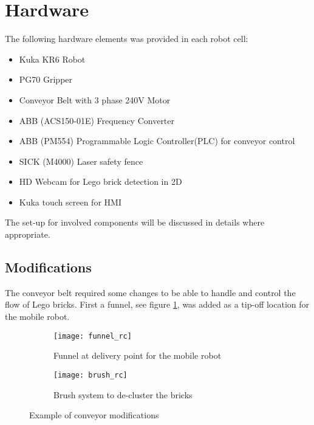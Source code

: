 \section{Hardware}
\label{sec:rc_hardware}
The following hardware elements was provided in each robot cell:

\begin{itemize}
	\item Kuka KR6 Robot
	\item PG70 Gripper
	\item Conveyor Belt with 3 phase 240V Motor
	\item ABB (ACS150-01E) Frequency Converter
	\item ABB (PM554) Programmable Logic Controller(PLC) for conveyor control
	\item SICK (M4000) Laser safety fence
	\item HD Webcam for Lego brick detection in 2D
	\item Kuka touch screen for HMI
\end{itemize}

The set-up for involved components will be discussed in details where appropriate. 

\subsection{Modifications}
The conveyor belt required some changes to be able to handle and control the flow of Lego bricks. First a funnel, see figure \ref{fig:funnel}, was added as a tip-off location for the mobile robot.

  	\begin{figure}[H]
        \centering
        \begin{subfigure}{0.48\textwidth}
			\texttt{[image: funnel\_rc]}
			\caption{Funnel at delivery point for the mobile robot}
			\label{fig:funnel}
        \end{subfigure}
        \hspace{10pt}
        \begin{subfigure}{0.48\textwidth}
			\texttt{[image: brush\_rc]}
			\caption{Brush system to de-cluster the bricks}
			\label{fig:brush}
    \end{subfigure}
    \caption{Example of conveyor modifications}
    \end{figure}

